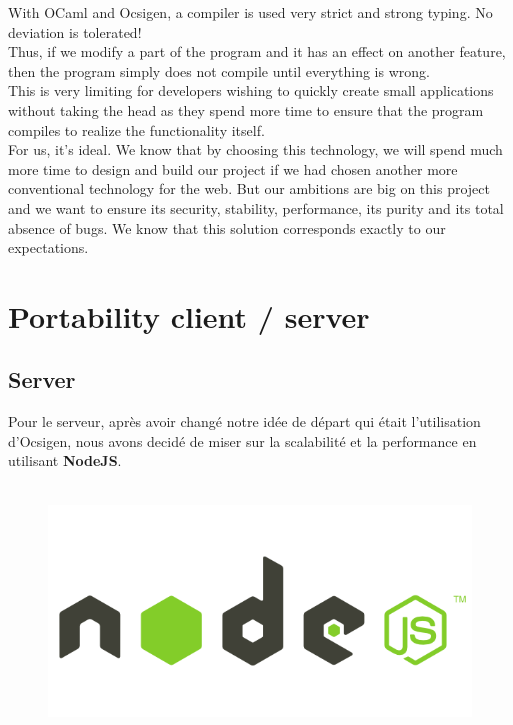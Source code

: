 \documentclass {life-en}
\begin{document}
\newpage

With OCaml and Ocsigen, a compiler is used very strict and strong typing. No deviation is tolerated!\\
Thus, if we modify a part of the program and it has an effect on another feature, then the program simply does not compile until everything is wrong.\\

This is very limiting for developers wishing to quickly create small applications without taking the head as they spend more time to ensure that the program compiles to realize the functionality itself.\\
For us, it's ideal. We know that by choosing this technology, we will spend much more time to design and build our project if we had chosen another more conventional technology for the web. But our ambitions are big on this project and we want to ensure its security, stability, performance, its purity and its total absence of bugs. We know that this solution corresponds exactly to our expectations.
\\

\section{Portability client / server}

\subsection{Server}

Pour le serveur, après avoir changé notre idée de départ qui était l'utilisation d'Ocsigen, nous avons decidé de miser sur la scalabilité et la performance en utilisant \textbf{NodeJS}.\\
\\


\begin{figure}[H]
  \begin{center}
    \includegraphics[width=13cm]{img/nodejs.png}
  \end{center}
\end{figure}
\end{document}
